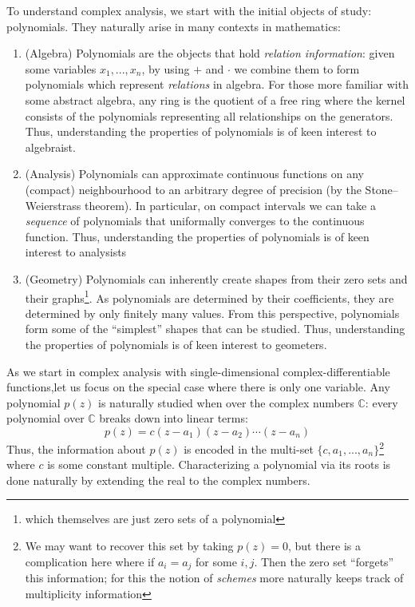 \documentclass{article}
\newcommand{\C}{\mathbb{C}}
\begin{document}
To understand complex analysis, we start with the initial objects of study: polynomials. They naturally arise
in many contexts in mathematics:
\begin{enumerate}
  \item (Algebra) Polynomials are the objects that hold \emph{relation information}: given some variables $x_1, ..., x_n$,
    by using $+$ and $\cdot$  we combine them to form polynomials which represent \emph{relations} in algebra. For those more
    familiar with some abstract algebra, any ring is the quotient of a free ring where the kernel consists of
    the polynomials representing all relationships on the generators. Thus, understanding the properties of
    polynomials is of keen interest to algebraist.
  \item (Analysis) Polynomials can approximate continuous functions on any (compact) neighbourhood to an
    arbitrary degree of precision (by the Stone–Weierstrass theorem). In particular, on compact intervals we can take
    a \emph{sequence} of polynomials that uniformally converges to the continuous function. Thus,
    understanding the properties of polynomials is of keen interest to analysists
   \item (Geometry) Polynomials can inherently create shapes from their zero sets and their
     graphs\footnote{which themselves are just zero sets of a polynomial}. As
     polynomials are determined by their coefficients, they are determined by only finitely many values.
     From this perspective, polynomials form some of the ``simplest'' shapes that can be studied. Thus,
     understanding the properties of polynomials is of keen interest to geometers.
 \end{enumerate}


As we start in complex analysis with single-dimensional complex-differentiable functions,let us focus on the
special case where there is only one variable. Any polynomial $p(z)$ is naturally studied when over the
complex numbers $\C$: every polynomial over $\C$ breaks down into linear terms:
\[
  p(z) = c(z-a_1)(z-a_2)\cdots (z-a_n)
\]
Thus, the information about $p(z)$ is encoded in the multi-set $\{c, a_1, ..., a_n\}$\footnote{We may want to
recover this set by taking $p(z) = 0$, but there is a complication here where if $a_i = a_j$ for some $i,j$.
Then the zero set ``forgets'' this information; for this the notion of \emph{schemes} more naturally keeps
track of multiplicity information} where $c$ is some constant multiple. Characterizing a polynomial via its
roots is done naturally by extending the real to the complex numbers.
\end{document}
